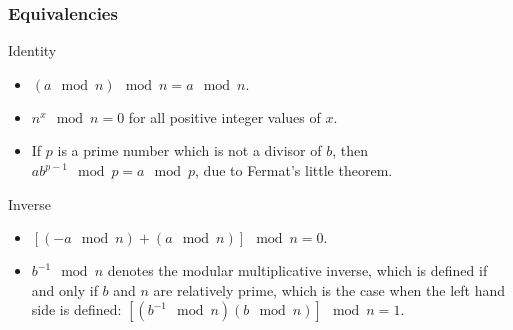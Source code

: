 \documentclass{beamer}
\begin{document}
\begin{frame}
\frametitle{Equivalencies}
 \begin{block}{Identity}
\begin{itemize}
\item $(a \mod n) \mod n = a \mod n.$
\item $n^x \mod n = 0$ for all positive integer values of $x$.
\item If $p$ is a prime number which is not a divisor of $b$, then\\ $ab^{p-1} \mod p = a \mod p$, due to Fermat's little theorem.
\end{itemize}
\end{block}
 \begin{block}{Inverse}
\begin{itemize}
\item $[(-a \mod n) + (a \mod n)] \mod n = 0.$
\item $b^{-1} \mod n$ denotes the modular multiplicative inverse, which is defined if and only if $b$ and $n$ are relatively prime, which is the case when the left hand side is defined: $[(b^{-1} \mod n)(b \mod n)] \mod n = 1$.
\end{itemize}
\end{block}

\end{frame}
\end{document}
